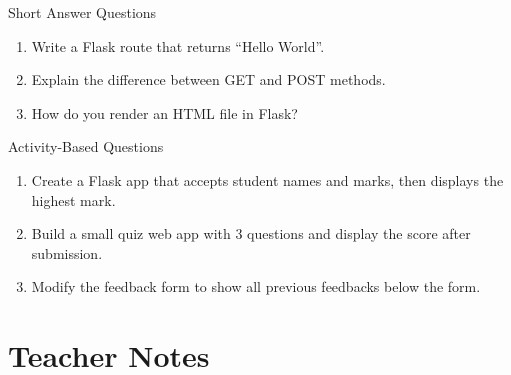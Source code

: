 \begin{exercise}{Short Answer Questions}
\begin{enumerate}
    \item Write a Flask route that returns “Hello World”.  
    \item Explain the difference between GET and POST methods.  
    \item How do you render an HTML file in Flask?  
\end{enumerate}
\end{exercise}

\begin{exercise}{Activity-Based Questions}
\begin{enumerate}
    \item Create a Flask app that accepts student names and marks, then displays the highest mark.  
    \item Build a small quiz web app with 3 questions and display the score after submission.  
    \item Modify the feedback form to show all previous feedbacks below the form.  
\end{enumerate}
\end{exercise}

\section{Teacher Notes}

